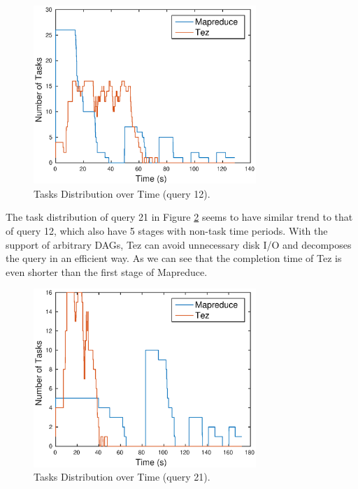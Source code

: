 \documentclass[10pt]{article}
\begin{document}
\begin{figure}
\begin{center}
\includegraphics[width=0.75\textwidth]{pic/q1c_task_distribution_12}
\caption{Tasks Distribution over Time (query 12).}
\label{fig:q1c_tasks_12}
\end{center}
\end{figure}

The task distribution of query 21 in Figure \ref{fig:q1c_tasks_21} seems to have similar trend to that of query 12, which also have 5 stages with non-task time periods. With the support of arbitrary DAGs, Tez can avoid unnecessary disk I/O and decomposes the query in an efficient way. As we can see that the completion time of Tez is even shorter than the first stage of Mapreduce.

\begin{figure}
\begin{center}
\includegraphics[width=0.75\textwidth]{pic/q1c_task_distribution_21}
\caption{Tasks Distribution over Time (query 21).}
\label{fig:q1c_tasks_21}
\end{center}
\end{figure}
\end{document}
